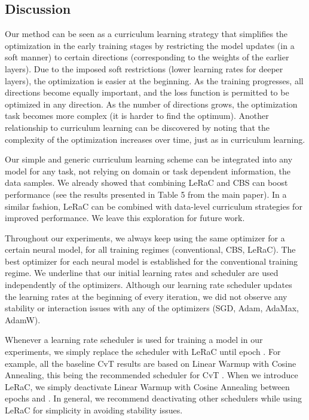 \documentclass[10pt,twocolumn,letterpaper]{article}
\begin{document}
\subsection{Discussion}

Our method can be seen as a curriculum learning strategy that simplifies the optimization in the early training stages by restricting the model updates (in a soft manner) to certain directions (corresponding to the weights of the earlier layers). Due to the imposed soft restrictions (lower learning rates for deeper layers), the optimization is easier at the beginning. As the training progresses, all directions become equally important, and the loss function is permitted to be optimized in any direction. As the number of directions grows, the optimization task becomes more complex (it is harder to find the optimum). Another relationship to curriculum learning can be discovered by noting that the complexity of the optimization increases over time, just as in curriculum learning.

Our simple and generic curriculum learning scheme can be integrated into any model for any task, not relying on domain or task dependent information, \eg the data samples. We already showed that combining LeRaC and CBS can boost performance (see the results presented in Table 5 from the main paper). In a similar fashion, LeRaC can be combined with data-level curriculum strategies for improved performance. We leave this exploration for future work.

Throughout our experiments, we always keep using the same optimizer for a certain neural model, for all training regimes (conventional, CBS, LeRaC). The best optimizer for each neural model is established for the conventional training regime. We underline that our initial learning rates and scheduler are used independently of the optimizers. Although our learning rate scheduler updates the learning rates at the beginning of every iteration, we did not observe any stability or interaction issues with any of the optimizers (SGD, Adam, AdaMax, AdamW).

Whenever a learning rate scheduler is used for training a model in our experiments, we simply replace the scheduler with LeRaC until epoch . For example, all the baseline CvT results are based on Linear Warmup with Cosine Annealing, this being the recommended scheduler for CvT \cite{Wu-ICCV-2021}. When we introduce LeRaC, we simply deactivate Linear Warmup with Cosine Annealing between epochs  and . In general, we recommend deactivating other schedulers while using LeRaC for simplicity in avoiding stability issues.
\end{document}
